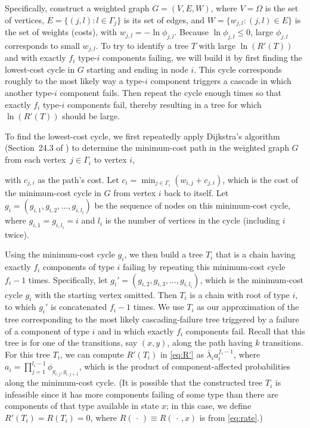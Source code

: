 \documentclass[12pt]{article}
\def\myxoutii{\bgroup \markoverwith{\textcolor{blue}{\hbox to.35em{\hss/\hss}}}\ULon}
\newcommand{\changed}[1]{#1}
\newcommand{\deletedii}[1]{}
\newcommand{\changedii}[1]{#1}
\newcommand{\changed}[1]{\textcolor{red}{#1}}
\newcommand{\changedii}[1]{\textcolor{blue}{#1}}
\newcommand{\deletedii}[1]{{\myxoutii{#1}}}
\begin{document}
\changed{
Specifically,
construct a weighted graph
$G = (V,E,W)$,
where $V = \Omega$ is the set of
vertices, $E = \{ (j,l) : l \in \Gamma_j \}$
is its set of edges,
and $W = \{ w_{j,l} : (j,l) \in E \}$
is the set of weights (costs),
with $w_{j,l} = -\ln \phi_{j,l}$.
Because $\ln \phi_{j,l} \leq 0$,
large $\phi_{j,l}$ corresponds to
small $w_{j,l}$.
To try to identify a tree $T$ with large
$\ln(R'(T))$ and with exactly
$f_i$ type-$i$ components failing,
we will build it
by first finding the lowest-cost cycle
in $G$
starting and ending in node $i$.
This cycle
corresponds roughly to
the most likely way a type-$i$
component triggers
a cascade in which another type-$i$ component
fails.
Then repeat the cycle
enough times so that exactly
$f_{i}$ type-$i$
components fail, thereby resulting in a
tree
for which $\ln(R'(T))$ should
be large.
}

\changed{
To find the lowest-cost cycle,
we first \changedii{repeatedly apply}
Dijkstra's algorithm
(Section~24.3 of \cite{CLRS:2001})
to determine the minimum-cost path
in the
weighted graph $G$ from 
\changedii{each vertex~$j \in \Gamma_i$}
to vertex $i$,
\deletedii{for each $j \in \Gamma_i$,}
\changedii{with $c_{j,i}$ as
the path's cost.}
Let $c_{i} = \min_{j \in \Gamma_{i}}
(w_{i,j} + c_{j,i})$,
which is the cost of the
minimum-cost cycle in $G$ from vertex $i$
back to itself.
Let $g_{i} = (g_{i,1}, g_{i,2},
\dots, g_{i,l_{i}})$ be the sequence of
nodes on this minimum-cost cycle,
where $g_{i,1} = g_{i,l_{i}} = i$
and $l_{i}$ is the number
of vertices in the cycle
(including $i$ twice).}

\changed{
Using the minimum-cost cycle $g_{i}$,
we then build a tree $T_{i}$ that is
a chain having
exactly $f_{i}$
components of type $i$ failing
by repeating this minimum-cost cycle
$f_{i} - 1$ times.
Specifically, let $g_{i}' =
(g_{i,2}, g_{i,3}, \ldots, g_{i,l_{i}})$,
which is the minimum-cost cycle $g_{i}$
with the starting vertex omitted.
Then $T_{i}$ is a chain with root
of type $i$, to which $g_{i}'$
is concatenated
$f_{i} - 1$ times.
We use $T_{i}$ as
our approximation of
the tree corresponding to the
most likely cascading-failure tree
triggered by a failure of a
component of type $i$ and in which
exactly $f_{i}$ components fail.
Recall that this tree is for 
one of
the transitions, 
\changedii{say $(x,y)$,}
along the path
having $k$ transitions.
For this tree $T_{i}$, we can compute
$R'(T_{i})$ in
\eqref{eq:R'} as $\bar{\lambda}_i
a_i^{f_i-1}$,
where
$a_i = \prod_{j=1}^{l_i-1}
\phi_{g_{i,j}, g_{i,j+1}}$,
which is the product of
component-affected probabilities
along the minimum-cost
cycle.
\changedii{(It is possible that the constructed
tree $T_i$ is infeasible since it has
more components failing of
some type than there are components
of that type available in state $x$;
in this case, we define 
$R'(T_i) = R(T_i) = 0$,
where $R( \, \cdot \, ) 
\equiv R( \, \cdot \, , x)$
is from \eqref{eq:rate}.)}
}
\end{document}

